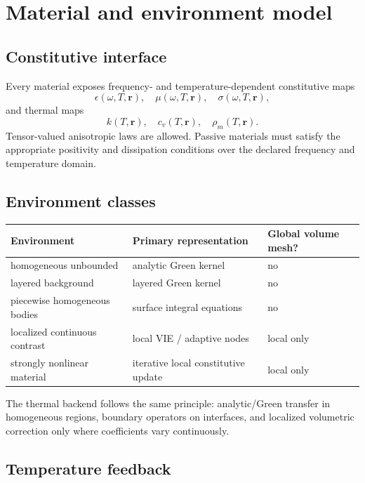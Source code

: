 \section{Material and environment model}

\subsection{Constitutive interface}

Every material exposes frequency- and temperature-dependent constitutive maps
\[
  \epsilon(\omega,T,\mathbf r),\quad
  \mu(\omega,T,\mathbf r),\quad
  \sigma(\omega,T,\mathbf r),
\]
and thermal maps
\[
  k(T,\mathbf r),\quad
  c_v(T,\mathbf r),\quad
  \rho_m(T,\mathbf r).
\]
Tensor-valued anisotropic laws are allowed. Passive materials must satisfy the
appropriate positivity and dissipation conditions over the declared frequency
and temperature domain.

\subsection{Environment classes}

\begin{center}
\begin{tabular}{lll}
\toprule
Environment & Primary representation & Global volume mesh?\\
\midrule
homogeneous unbounded & analytic Green kernel & no\\
layered background & layered Green kernel & no\\
piecewise homogeneous bodies & surface integral equations & no\\
localized continuous contrast & local VIE / adaptive nodes & local only\\
strongly nonlinear material & iterative local constitutive update & local only\\
\bottomrule
\end{tabular}
\end{center}

The thermal backend follows the same principle: analytic/Green transfer in
homogeneous regions, boundary operators on interfaces, and localized volumetric
correction only where coefficients vary continuously.

\subsection{Temperature feedback}

